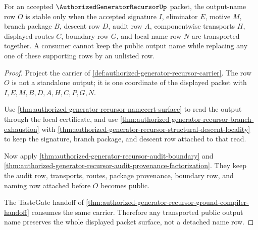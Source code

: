 \begin{theorem}
\label{thm:authorized-generator-recursor-output-name-stability}
For an accepted $\AuthorizedGeneratorRecursorUp$ packet, the output-name row $O$ is stable only when the accepted signature $I$, eliminator $E$, motive $M$, branch package $B$, descent row $D$, audit row $A$, componentwise transports $H$, displayed routes $C$, boundary row $G$, and local name row $N$ are transported together. A consumer cannot keep the public output name while replacing any one of these supporting rows by an unlisted row.
\end{theorem}
\begin{proof}
Project the carrier of \autoref{def:authorized-generator-recursor-carrier}. The row $O$ is not a standalone output; it is one coordinate of the displayed packet with $I,E,M,B,D,A,H,C,P,G,N$.

Use \autoref{thm:authorized-generator-recursor-namecert-surface} to read the output through the local certificate, and use \autoref{thm:authorized-generator-recursor-branch-exhaustion} with \autoref{thm:authorized-generator-recursor-structural-descent-locality} to keep the signature, branch package, and descent row attached to that read.

Now apply \autoref{thm:authorized-generator-recursor-audit-boundary} and \autoref{thm:authorized-generator-recursor-audit-provenance-factorization}. They keep the audit row, transports, routes, package provenance, boundary row, and naming row attached before $O$ becomes public.

The TasteGate handoff of \autoref{thm:authorized-generator-recursor-ground-compiler-handoff} consumes the same carrier. Therefore any transported public output name preserves the whole displayed packet surface, not a detached name row.
\end{proof}

